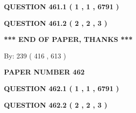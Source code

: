 \documentclass[12pt]{article}
\begin{document}
   
   
   
 \vspace{0.2in}
 
 
 
 
   
   
  
\vspace{0.2in}
  
{\textbf{\Large{QUESTION
461.1 
 ( 1 , 1 , 6791 )
}}}
  
  
  
\vspace{0.2in}
  
{\textbf{\Large{QUESTION
461.2 
 ( 2 , 2 , 3 )
}}}
  
  
   
   
 \vspace{0.2in}
 
   
   
   
   
\vspace{1.0in} 
{\textbf{\large{ *** END OF PAPER, THANKS *** }}} 
   
   
\hspace{1.0in} By: 
 239 ( 416 ,  613 )
   
   
   
   
\newpage 
\setcounter{page}{ 
   462001 } 
   
   
   
   
 {\textbf{ \Large{ PAPER NUMBER  462  }}}
   
   
\vspace{0.2in}
   
   
   
   
   
   
 \vspace{0.2in}
 
 
 
 
   
   
  
\vspace{0.2in}
  
{\textbf{\Large{QUESTION
462.1 
 ( 1 , 1 , 6791 )
}}}
  
  
  
\vspace{0.2in}
  
{\textbf{\Large{QUESTION
462.2 
 ( 2 , 2 , 3 )
}}}
  
  
   
   
 \vspace{0.2in}
 
\end{document}
